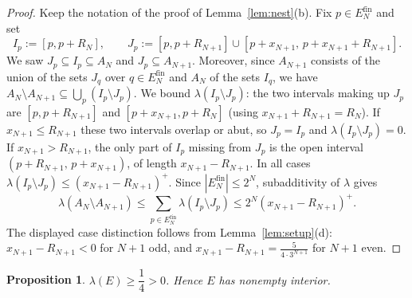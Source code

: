 \documentclass{amsart}
\newtheorem{proposition}{Proposition}
\theoremstyle{definition}
\begin{document}
\begin{proof}
Keep the notation of the proof of Lemma~\ref{lem:nest}(b). Fix $p\in E_N^{\mathrm{fin}}$ and set
\[
  I_p:=[p,p+R_N],\qquad
  J_p:=[p,p+R_{N+1}]\cup[p+x_{N+1},\,p+x_{N+1}+R_{N+1}].
\]
We saw $J_p\subseteq I_p\subseteq A_N$ and $J_p\subseteq A_{N+1}$. Moreover, since $A_{N+1}$ consists
of the union of the sets $J_q$ over $q\in E_N^{\mathrm{fin}}$ and $A_N$ of the sets $I_q$, we have
$A_N\setminus A_{N+1}\subseteq\bigcup_{p}(I_p\setminus J_p)$. We bound $\lambda(I_p\setminus J_p)$:
the two intervals making up $J_p$ are $[p,p+R_{N+1}]$ and $[p+x_{N+1},p+R_N]$ (using
$x_{N+1}+R_{N+1}=R_N$). If $x_{N+1}\le R_{N+1}$ these two intervals overlap or abut, so $J_p=I_p$ and
$\lambda(I_p\setminus J_p)=0$. If $x_{N+1}>R_{N+1}$, the only part of $I_p$ missing from $J_p$ is the
open interval $(p+R_{N+1},\,p+x_{N+1})$, of length $x_{N+1}-R_{N+1}$. In all cases
$\lambda(I_p\setminus J_p)\le(x_{N+1}-R_{N+1})^+$. Since $|E_N^{\mathrm{fin}}|\le2^N$, subadditivity
of $\lambda$ gives
\[
  \lambda(A_N\setminus A_{N+1})\le\sum_{p\in E_N^{\mathrm{fin}}}\lambda(I_p\setminus J_p)
    \le 2^N (x_{N+1}-R_{N+1})^{+}.
\]
The displayed case distinction follows from Lemma~\ref{lem:setup}(d): $x_{N+1}-R_{N+1}<0$ for $N+1$
odd, and $x_{N+1}-R_{N+1}=\frac{5}{4\cdot3^{N+1}}$ for $N+1$ even.
\end{proof}

\begin{proposition}\label{prop:posmeasure}
$\lambda(E)\ge\dfrac14>0$. Hence $E$ has nonempty interior.
\end{proposition}
\end{document}
